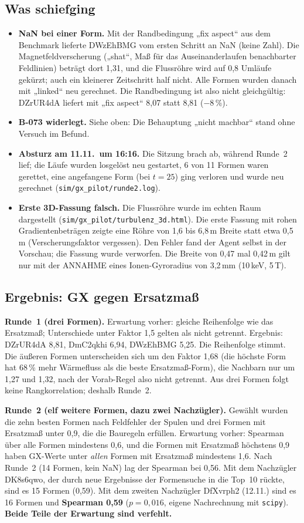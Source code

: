 \subsection{Was schiefging}
\begin{itemize}\itemsep1pt
\item \textbf{NaN bei einer Form.} Mit der Randbedingung „fix aspect“ aus dem Benchmark lieferte DWzEhBMG vom ersten Schritt an NaN (keine Zahl). Die Magnetfeldverscherung („shat“, Maß für das Auseinanderlaufen benachbarter Feldlinien) beträgt dort 1,31, und die Flussröhre wird auf 0,8 Umläufe gekürzt;
auch ein kleinerer Zeitschritt half nicht. Alle Formen wurden danach mit „linked“ neu gerechnet. Die Randbedingung ist also nicht gleichgültig: DZrUR4dA liefert mit „fix aspect“ 8,07 statt 8,81 ($-8\,\%$).
\item \textbf{B-073 widerlegt.} Siehe oben: Die Behauptung „nicht machbar“ stand ohne Versuch im Befund.
\item \textbf{Absturz am 11.11.\ um 16:16.} Die Sitzung brach ab, während Runde~2 lief; die Läufe wurden losgelöst neu gestartet, 6 von 11 Formen waren gerettet, eine angefangene Form (bei $t=25$) ging verloren und wurde neu gerechnet (\texttt{sim/gx\_pilot/runde2.log}).
\item \textbf{Erste 3D-Fassung falsch.} Die Flussröhre wurde im echten Raum dargestellt (\texttt{sim/gx\_pilot/turbulenz\_3d.html}). Die erste Fassung mit rohen Gradientenbeträgen zeigte eine Röhre von 1,6 bis 6,8\,m Breite statt etwa 0,5\,m (Verscherungsfaktor vergessen). Den Fehler fand der Agent selbst in der Vorschau; die Fassung wurde verworfen. Die Breite von 0,47 mal 0,42\,m gilt nur mit der ANNAHME eines Ionen-Gyroradius von 3,2\,mm (10\,keV, 5\,T).
\end{itemize}

\subsection{Ergebnis: GX gegen Ersatzmaß}
\textbf{Runde~1 (drei Formen).} Erwartung vorher: gleiche Reihenfolge wie das Ersatzmaß; Unterschiede unter Faktor 1,5 gelten als nicht getrennt. Ergebnis: DZrUR4dA 8,81, DmC2qkhi 6,94, DWzEhBMG 5,25. Die Reihenfolge stimmt. Die äußeren Formen unterscheiden sich um den Faktor 1,68 (die höchste Form hat 68\,\% mehr Wärmefluss als die beste Ersatzmaß-Form),
die Nachbarn nur um 1,27 und 1,32, nach der Vorab-Regel also nicht getrennt. Aus drei Formen folgt keine Rangkorrelation; deshalb Runde~2.

\textbf{Runde~2 (elf weitere Formen, dazu zwei Nachzügler).} Gewählt wurden die zehn besten Formen nach Feldfehler der Spulen und drei Formen mit Ersatzmaß unter 0,9, die die Bauregeln erfüllen. Erwartung vorher: Spearman über alle Formen mindestens 0,6, und die Formen mit Ersatzmaß höchstens 0,9 haben GX-Werte unter \emph{allen} Formen mit Ersatzmaß mindestens 1,6.
Nach Runde~2 (14 Formen, kein NaN) lag der Spearman bei 0,56. Mit dem Nachzügler DK8s6qwo, der durch neue Ergebnisse der Formensuche in die Top~10 rückte, sind es 15 Formen (0,59). Mit dem zweiten Nachzügler DfXvrph2 (12.11.) sind es 16 Formen und \textbf{Spearman 0,59} ($p=0{,}016$, eigene Nachrechnung mit \texttt{scipy}). \textbf{Beide Teile der Erwartung sind verfehlt.}

